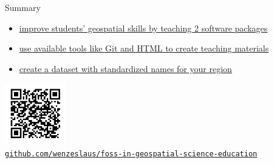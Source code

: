 \documentclass[xcolor={dvipsnames,usenames},beamer]{beamer}
\begin{document}
\begin{frame}{}

\begin{block}{Summary}
 \begin{itemize}
  \item \href{http://dx.doi.org/10.3390/ijgi4020942}%
    {improve students' geospatial skills by teaching 2 software packages}
  \item \href{http://dx.doi.org/10.3390/ijgi4020942}%
    {use available tools like Git and HTML to create teaching materials}
  \item \href{http://grasswiki.osgeo.org/wiki/GRASS_GIS_Standardized_Sample_Datasets}%
    {create a dataset with standardized names for your region}
 \end{itemize}

\end{block}

\bigskip

\centering
\href{https://github.com/wenzeslaus/foss-in-geospatial-science-education}{%
\includegraphics[width=0.2\textwidth]{./images/general/slides_qr}\\%
\texttt{github.com/wenzeslaus/foss-in-geospatial-science-education}%
}

\end{frame}
\end{document}
